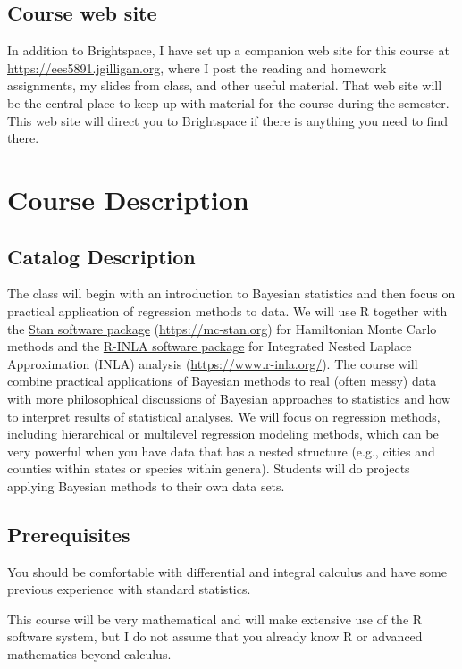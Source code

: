 \documentclass[11pt,twoside]{jgsyllabus}\usepackage[]{graphicx}\usepackage[]{xcolor}
\begin{document}
\subsection{Course web site}
In addition to Brightspace, I have set up a companion web site for this
course at
\url{https://ees5891.jgilligan.org},
where I post the reading and homework assignments,
my slides from class, and other useful material. That web site will be the
central place to keep up with material for the course during the semester.
This web site will direct you to Brightspace if there is anything you need to
find there.

\medskip
\clearpage
\section[Description]{Course Description}
\subsection{Catalog Description}
The class will begin with an introduction to Bayesian statistics and then focus
on practical application of regression methods to data. We will use R together
with the
\href{https://mc-stan.org}{Stan software package} (\url{https://mc-stan.org})
for Hamiltonian Monte Carlo methods
and the \href{https://www.r-inla.org/}{R-INLA software package}
for Integrated Nested Laplace Approximation (INLA) analysis
(\url{https://www.r-inla.org/}).
The course will combine practical applications of Bayesian methods to real
(often messy) data with more philosophical discussions of Bayesian approaches
to statistics and how to interpret results of statistical analyses.
We will focus on regression methods, including hierarchical or
multilevel regression modeling methods, which can be very powerful when you
have data that has a nested structure (e.g., cities and counties within states
or species within genera). Students will do projects applying Bayesian methods
to their own data sets.

\subsection{Prerequisites}
You should be comfortable with differential and integral calculus and have
some previous experience with standard statistics.

This course will be very mathematical and will make extensive use of the R
software system, but I do not assume that you already know R or advanced
mathematics beyond calculus.
\end{document}
